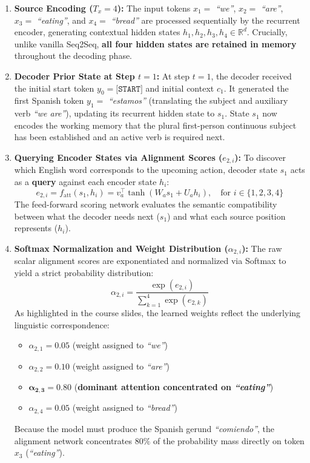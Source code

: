 \begin{enumerate}[leftmargin=*]
    \item \textbf{Source Encoding ($T_x = 4$):}
    The input tokens $x_1 =$ \textit{“we”}, $x_2 =$ \textit{“are”}, $x_3 =$ \textit{“eating”}, and $x_4 =$ \textit{“bread”} are processed sequentially by the recurrent encoder, generating contextual hidden states $h_1, h_2, h_3, h_4 \in \mathbb{R}^d$. Crucially, unlike vanilla Seq2Seq, \textbf{all four hidden states are retained in memory} throughout the decoding phase.

    \item \textbf{Decoder Prior State at Step $t=1$:}
    At step $t=1$, the decoder received the initial start token $y_0 = \texttt{[START]}$ and initial context $c_1$. It generated the first Spanish token $y_1 =$ \textit{“estamos”} (translating the subject and auxiliary verb \textit{“we are”}), updating its recurrent hidden state to $s_1$. State $s_1$ now encodes the working memory that the plural first-person continuous subject has been established and an active verb is required next.

    \item \textbf{Querying Encoder States via Alignment Scores ($e_{2, i}$):}
    To discover which English word corresponds to the upcoming action, decoder state $s_1$ acts as a \textbf{query} against each encoder state $h_i$:
    \begin{equation}
        e_{2, i} = f_{\text{att}}(s_1, h_i) = v_a^\top \tanh(W_a s_1 + U_a h_i), \quad \text{for } i \in \{1, 2, 3, 4\}
    \end{equation}
    The feed-forward scoring network evaluates the semantic compatibility between what the decoder needs next ($s_1$) and what each source position represents ($h_i$).

    \item \textbf{Softmax Normalization and Weight Distribution ($\alpha_{2, i}$):}
    The raw scalar alignment scores are exponentiated and normalized via Softmax to yield a strict probability distribution:
    \begin{equation}
        \alpha_{2, i} = \frac{\exp(e_{2, i})}{\sum_{k=1}^4 \exp(e_{2, k})}
    \end{equation}
    As highlighted in the course slides, the learned weights reflect the underlying linguistic correspondence:
    \begin{itemize}[leftmargin=*]
        \item $\alpha_{2, 1} = 0.05$ (weight assigned to \textit{“we”})
        \item $\alpha_{2, 2} = 0.10$ (weight assigned to \textit{“are”})
        \item $\mathbf{\alpha_{2, 3} = 0.80}$ (\textbf{dominant attention concentrated on \textit{“eating”}})
        \item $\alpha_{2, 4} = 0.05$ (weight assigned to \textit{“bread”})
    \end{itemize}
    Because the model must produce the Spanish gerund \textit{“comiendo”}, the alignment network concentrates $80\%$ of the probability mass directly on token $x_3$ (\textit{“eating”}).


\end{enumerate}
